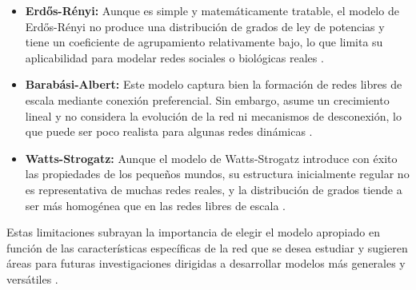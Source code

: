 \begin{itemize}
    \item \textbf{Erdős-Rényi:} Aunque es simple y matemáticamente tratable, el modelo de Erdős-Rényi no produce una distribución de grados de ley de potencias y tiene un coeficiente de agrupamiento relativamente bajo, lo que limita su aplicabilidad para modelar redes sociales o biológicas reales .
    \item \textbf{Barabási-Albert:} Este modelo captura bien la formación de redes libres de escala mediante conexión preferencial. Sin embargo, asume un crecimiento lineal y no considera la evolución de la red ni mecanismos de desconexión, lo que puede ser poco realista para algunas redes dinámicas .
    \item \textbf{Watts-Strogatz:} Aunque el modelo de Watts-Strogatz introduce con éxito las propiedades de los pequeños mundos, su estructura inicialmente regular no es representativa de muchas redes reales, y la distribución de grados tiende a ser más homogénea que en las redes libres de escala .
\end{itemize}

Estas limitaciones subrayan la importancia de elegir el modelo apropiado en función de las características específicas de la red que se desea estudiar y sugieren áreas para futuras investigaciones dirigidas a desarrollar modelos más generales y versátiles .
